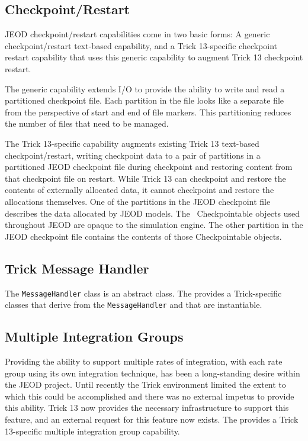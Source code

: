 \subsection{Checkpoint/Restart}

JEOD checkpoint/restart capabilities come in two basic forms:
A generic checkpoint/restart text-based capability,
and a Trick 13-specific checkpoint restart capability that uses this generic
capability to augment Trick 13 checkpoint restart.

The generic capability extends \Cplusplus I/O to provide the ability to write
and read a partitioned checkpoint file. Each partition in the file looks like
a separate file from the perspective of start and end of file markers.
This partitioning reduces the number of files that need to be managed.

The Trick 13-specific capability augments existing Trick 13 text-based
checkpoint/restart, writing checkpoint data to a pair of partitions
in a partitioned JEOD checkpoint file during checkpoint
and restoring content from that checkpoint file on restart.
While Trick 13 can checkpoint and restore the contents of
externally allocated data,  it cannot checkpoint and restore the
allocations themselves. One of the partitions in the JEOD checkpoint file
describes the data allocated by JEOD models. The \CONTAINER\ Checkpointable
objects used throughout JEOD are opaque to the simulation engine.
The other partition in the JEOD checkpoint file contains the contents
of those Checkpointable objects.

\subsection{Trick Message Handler}
The \verb|MessageHandler| class is an abstract class.
The \ModelDesc provides a Trick-specific classes that derive from
the \verb|MessageHandler| and that are instantiable.

\subsection{Multiple Integration Groups}
Providing the ability to support multiple rates of integration, with each
rate group using its own integration technique, has been a long-standing desire
within the JEOD project.
Until recently the Trick environment limited the extent to which this could be
accomplished and there was no external impetus to provide this ability.
Trick 13 now provides the necessary infrastructure to support this feature,
and an external request for this feature now exists.
The \ModelDesc provides a Trick 13-specific
multiple integration group capability.

